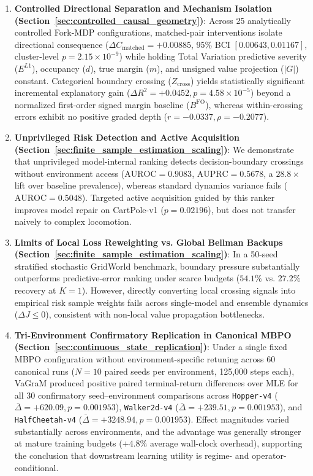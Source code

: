 \documentclass[journal,10pt,twocolumn]{IEEEtran}
\begin{document}
\begin{enumerate}
    \item \textbf{Controlled Directional Separation and Mechanism Isolation (Section~\ref{sec:controlled_causal_geometry})}: Across 25 analytically controlled Fork-MDP configurations, matched-pair interventions isolate directional consequence ($\Delta C_{\mathrm{matched}} = +0.00885$, 95\% BCI $[0.00643, 0.01167]$, cluster-level $p = 2.15 \times 10^{-9}$) while holding Total Variation predictive severity ($E^{L1}$), occupancy ($d$), true margin ($m$), and unsigned value projection ($|G|$) constant. Categorical boundary crossing ($Z_{\mathrm{cross}}$) yields statistically significant incremental explanatory gain ($\Delta R^2 = +0.0452, p = 4.58 \times 10^{-5}$) beyond a normalized first-order signed margin baseline ($B^{\mathrm{FO}}$), whereas within-crossing errors exhibit no positive graded depth ($r = -0.0337, \rho = -0.2077$).
    \item \textbf{Unprivileged Risk Detection and Active Acquisition (Section~\ref{sec:finite_sample_estimation_scaling})}: We demonstrate that unprivileged model-internal ranking detects decision-boundary crossings without environment access ($\text{AUROC} = 0.9083$, $\text{AUPRC} = 0.5678$, a $28.8\times$ lift over baseline prevalence), whereas standard dynamics variance fails ($\text{AUROC} = 0.5048$). Targeted active acquisition guided by this ranker improves model repair on CartPole-v1 ($p = 0.02196$), but does not transfer naively to complex locomotion.
    \item \textbf{Limits of Local Loss Reweighting vs. Global Bellman Backups (Section~\ref{sec:finite_sample_estimation_scaling})}: In a 50-seed stratified stochastic GridWorld benchmark, boundary pressure substantially outperforms predictive-error ranking under scarce budgets ($54.1\%$ vs. $27.2\%$ recovery at $K=1$). However, directly converting local crossing signals into empirical risk sample weights fails across single-model and ensemble dynamics ($\Delta J \le 0$), consistent with non-local value propagation bottlenecks.
    \item \textbf{Tri-Environment Confirmatory Replication in Canonical MBPO (Section~\ref{sec:continuous_state_replication})}: Under a single fixed MBPO configuration without environment-specific retuning across 60 canonical runs ($N=10$ paired seeds per environment, 125,000 steps each), VaGraM produced positive paired terminal-return differences over MLE for all 30 confirmatory seed--environment comparisons across \texttt{Hopper-v4} ($\bar{\Delta} = +620.09, p=0.001953$), \texttt{Walker2d-v4} ($\bar{\Delta} = +239.51, p=0.001953$), and \texttt{HalfCheetah-v4} ($\bar{\Delta} = +3248.94, p=0.001953$). Effect magnitudes varied substantially across environments, and the advantage was generally stronger at mature training budgets ($+4.8\%$ average wall-clock overhead), supporting the conclusion that downstream learning utility is regime- and operator-conditional.
\end{enumerate}
\end{document}
